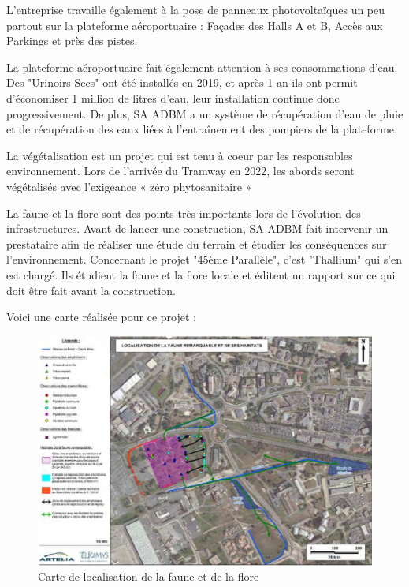 L'entreprise travaille également à la pose de panneaux photovoltaïques un peu partout sur la plateforme aéroportuaire : Façades des Halls A et B, Accès aux Parkings et près des pistes.

La plateforme aéroportuaire fait également attention à ses consommations d'eau. Des "Urinoirs Secs" ont été installés en 2019, et après 1 an ils ont permit d'économiser 1 million de litres d'eau, leur installation continue donc progressivement.
De plus, SA ADBM a un système de récupération d'eau de pluie et de récupération des eaux liées à l'entraînement des pompiers de la plateforme.\newline

La végétalisation est un projet qui est tenu à coeur par les responsables environnement. Lors de l'arrivée du Tramway en 2022, les abords seront végétalisés avec l'exigeance « zéro phytosanitaire »

La faune et la flore sont des points très importants lors de l'évolution des infrastructures. Avant de lancer une construction, SA ADBM fait intervenir un prestataire afin de réaliser une étude du terrain et étudier les conséquences sur l'environnement.
Concernant le projet "45ème Parallèle", c'est "Thallium" qui s'en est chargé. Ils étudient la faune et la flore locale et éditent un rapport sur ce qui doit être fait avant la construction.

Voici une carte réalisée pour ce projet :

\begin{figure}[hbt!]
  \centering
  \includegraphics[width=14cm]{Images/carteenvironnement.png}
  \caption{Carte de localisation de la faune et de la flore}
  \label{fig:crapeau}
\end{figure}

